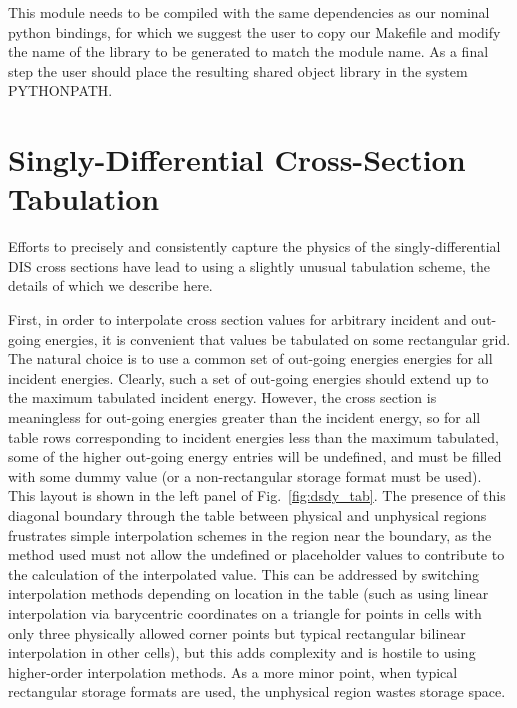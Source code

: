 \documentclass[3p,12pt]{elsarticle}
\newcommand{\ttf}{\ttfamily}
\begin{document}
This module needs to be compiled with the same dependencies as our nominal python bindings, for which we suggest the user
to copy our Makefile and modify the name of the library to be generated to match the module name. As a final step the user
should place the resulting shared object library in the system {\ttf PYTHONPATH}.

\section{Singly-Differential Cross-Section Tabulation}
\label{sec:differential_tabulation}
Efforts to precisely and consistently capture the physics of the singly-differential DIS cross sections have lead to using a slightly unusual tabulation scheme, the details of which we describe here. 

First, in order to interpolate cross section values for arbitrary incident and out-going energies, it is convenient that values be tabulated on some rectangular grid. 
The natural choice is to use a common set of out-going energies energies for all incident energies. 
Clearly, such a set of out-going energies should extend up to the maximum tabulated incident energy. 
However, the cross section is meaningless for out-going energies greater than the incident energy, so for all table rows corresponding to incident energies less than the maximum tabulated, some of the higher out-going energy entries will be undefined, and must be filled with some dummy value (or a non-rectangular storage format must be used). 
This layout is shown in the left panel of Fig.~\ref{fig:dsdy_tab}. 
The presence of this diagonal boundary through the table between physical and unphysical regions frustrates simple interpolation schemes in the region near the boundary, as the method used must not allow the undefined or placeholder values to contribute to the calculation of the interpolated value. 
This can be addressed by switching interpolation methods depending on location in the table (such as using linear interpolation via barycentric coordinates on a triangle for points in cells with only three physically allowed corner points but typical rectangular bilinear interpolation in other cells), but this adds complexity and is hostile to using higher-order interpolation methods. 
As a more minor point, when typical rectangular storage formats are used, the unphysical region wastes storage space. 
\end{document}
